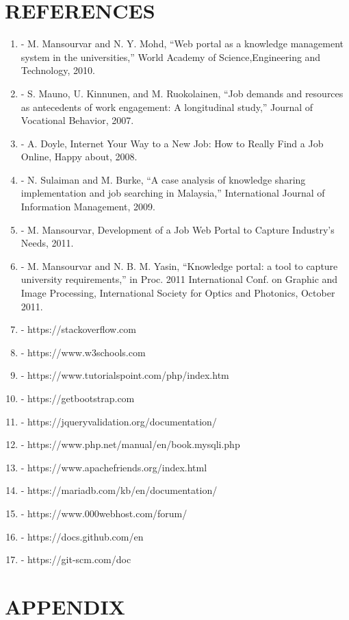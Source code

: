 \documentclass[a4paper,12pt]{report}
\begin{document}
\pagebreak

\chapter{REFERENCES}

\begin{enumerate}
\item - M. Mansourvar and N. Y. Mohd, “Web portal as a knowledge management system in the universities,” World Academy of Science,Engineering and Technology, 2010.
\item - S. Mauno, U. Kinnunen, and M. Ruokolainen, “Job demands and resources as antecedents of work engagement: A longitudinal study,” Journal of Vocational Behavior, 2007.
\item - A. Doyle, Internet Your Way to a New Job: How to Really Find a Job Online, Happy about, 2008.
\item - N. Sulaiman and M. Burke, “A case analysis of knowledge sharing implementation and job searching in Malaysia,” International Journal of Information Management, 2009.
\item - M. Mansourvar, Development of a Job Web Portal to Capture Industry’s Needs, 2011.
\item - M. Mansourvar and N. B. M. Yasin, “Knowledge portal: a tool to capture university requirements,” in Proc. 2011 International Conf. on Graphic and Image Processing, International Society for Optics and Photonics, October 2011.

	\item - https://stackoverflow.com
	\item - https://www.w3schools.com
	\item - https://www.tutorialspoint.com/php/index.htm
	\item - https://getbootstrap.com
	\item - https://jqueryvalidation.org/documentation/
	\item - https://www.php.net/manual/en/book.mysqli.php
	\item - https://www.apachefriends.org/index.html
	\item -	https://mariadb.com/kb/en/documentation/
	\item -	https://www.000webhost.com/forum/
	\item -	https://docs.github.com/en
	\item -	https://git-scm.com/doc
\end{enumerate} 
\pagebreak

\chapter{APPENDIX}
\end{document}
